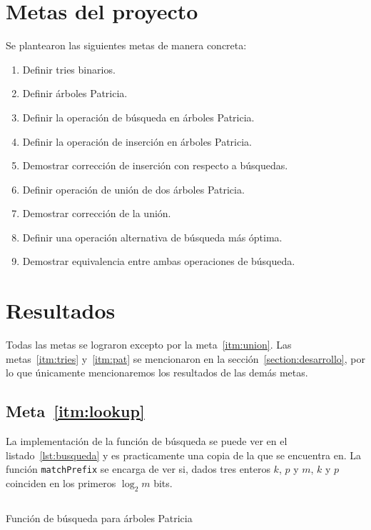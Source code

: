 \documentclass[11pt,letterpaper]{article}
\begin{document}
\section{Metas del proyecto}
\noindent Se plantearon las siguientes metas de manera concreta:
\begin{enumerate}
\item Definir tries binarios. \label{itm:tries}
\item Definir árboles Patricia.\label{itm:pat}
\item Definir la operación de búsqueda en árboles Patricia.\label{itm:lookup}
\item Definir la operación de inserción en árboles Patricia. \label{itm:insert}
\item Demostrar corrección de inserción con respecto a búsquedas.\label{itm:dem1}
\item Definir operación de unión de dos árboles Patricia.\label{itm:defUnion}
\item Demostrar corrección de la unión. \label{itm:union}
\item Definir una operación alternativa de búsqueda más óptima.\label{itm:busqueda2}
\item Demostrar equivalencia entre ambas operaciones de búsqueda.\label{itm:prueba2} 
\end{enumerate}
\section{Resultados}
\noindent Todas las metas se lograron excepto por la meta~\ref{itm:union}. Las metas~\ref{itm:tries} y~\ref{itm:pat} se mencionaron en la sección~\ref{section:desarrollo}, por lo que únicamente mencionaremos los resultados de las demás metas.
\subsection{Meta~\ref{itm:lookup}}
\noindent La implementación de la función de búsqueda se puede ver en el listado~\ref{lst:busqueda} y es practicamente una copia de la que se encuentra en\cite{okasaki_fast_1998}. La función \texttt{matchPrefix} se encarga de ver si, dados tres enteros $k$, $p$ y $m$, $k$ y $p$ coinciden en los primeros $\log_2m$ bits.

\begin{listing}[H]
  \inputminted{coq}{src/busqueda.v}
  \caption{Función de búsqueda para árboles Patricia}
  \label{lst:busqueda}
\end{listing}
\end{document}
